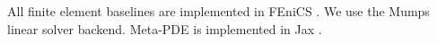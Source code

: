 All finite element baselines are implemented in FEniCS
\citep{LoggMardalEtAl2012a,AlnaesBlechta2015a}.
We use the Mumps linear solver backend.
Meta-PDE is implemented in Jax \citep{jax2018github}.



